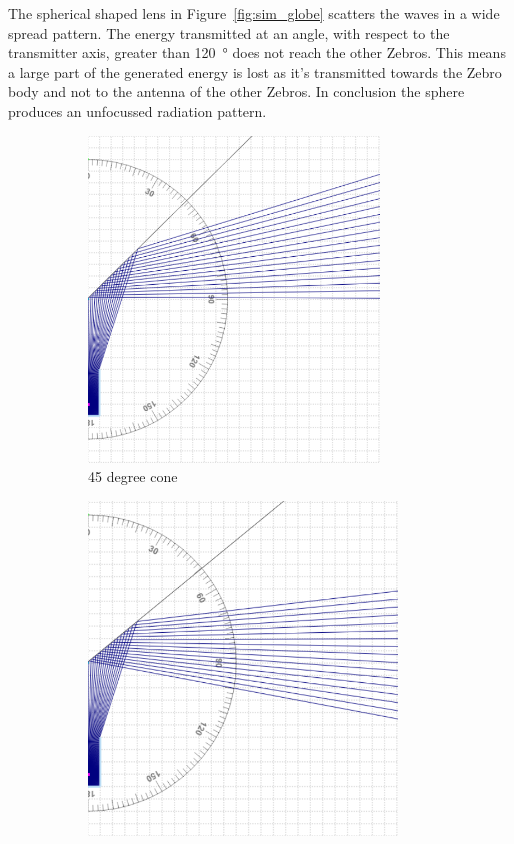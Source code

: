 The spherical shaped lens in Figure~\ref{fig:sim_globe} scatters the waves in a wide spread pattern.
The energy transmitted at an angle, with respect to the transmitter axis, greater than \SI{120}{\degree} does not reach the other Zebros.
This means a large part of the generated energy is lost as it's transmitted towards the Zebro body and not to the antenna of the other Zebros.
In conclusion the sphere produces an unfocussed radiation pattern.

\begin{figure}[H]
\centering
\begin{subfigure}{.5\textwidth}
  \centering
  \includegraphics[width=0.85\textwidth]{Figures/sim_cone_45.PNG}
  \caption{45 degree cone}
  \label{fig:sim_cone_45}
\end{subfigure}%
\begin{subfigure}{.5\textwidth}
  \centering
  \includegraphics[width=0.9\textwidth]{Figures/sim_cone_50.PNG}

\end{subfigure}
\end{figure}
